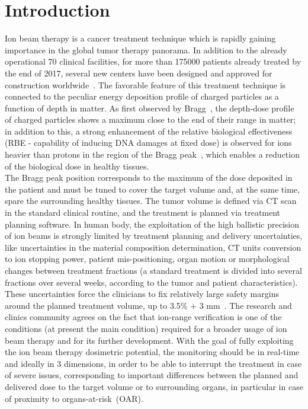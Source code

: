 \section{Introduction}\label{section::Intro}
Ion beam therapy is a cancer treatment technique which is rapidly gaining importance in the global tumor therapy panorama. In addition to the already operational 70 clinical facilities, for more than 175000 patients already treated by the end of 2017, several new centers have been designed and approved for construction worldwide~\cite{PTCOG_stats}. The favorable feature of this treatment technique is connected to the peculiar energy deposition profile of charged particles as a function of depth in matter. As first observed by Bragg~\cite{Bragg_main}, the depth-dose profile of charged particles shows a maximum close to the end of their range in matter; in addition to this, a strong enhancement of the relative biological effectiveness (RBE - capability of inducing DNA damages at fixed dose) is observed for ions heavier than protons in the region of the Bragg peak~\cite{RBE_Elsasser, RBE_Weyrather}, which enables a reduction of the biological dose in healthy tissues.\\
The Bragg peak position corresponds to the maximum of the dose deposited in the patient and must be tuned to cover the target volume and, at the same time, spare the surrounding healthy tissues. The tumor volume is defined via CT scan in the standard clinical routine, and the treatment is planned via treatment planning software. In human body, the exploitation of the high ballistic precision of ion beams is strongly limited by treatment planning and delivery uncertainties, like uncertainties in the material composition determination, CT units conversion to ion stopping power, patient mis-positioning, organ motion or morphological changes between treatment fractions (a standard treatment is divided into several fractions over several weeks, according to the tumor and patient characteristics). These uncertainties force the clinicians to fix relatively large safety margins around the planned treatment volume, up to 3.5\% + 3 mm~\cite{Paganetti:2012aa}. The research and clinics community agrees on the fact that ion-range verification is one of the conditions (at present the main condition) required for a broader usage of ion beam therapy and for its further development. With the goal of fully exploiting the ion beam therapy dosimetric potential, the monitoring should be in real-time and ideally in 3 dimensions, in order to be able to interrupt the treatment in case of severe issues, corresponding to important differences between the planned and delivered dose to the target volume or to surrounding organs, in particular in case of proximity to organs-at-risk~(OAR).\\
